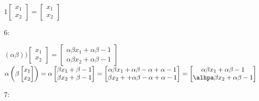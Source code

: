 \begin{solution}
		   \begin{center}
		    $
		    1
		    \begin{bmatrix}
		         x_1 \\ x_2
		    \end{bmatrix}
		    =
		    \begin{bmatrix}
		         x_1 \\ x_2
		    \end{bmatrix}
		    $
		    \end{center}
		   
		   
		   6:\\
		   
		   \begin{center}
		    $
		    \left( \alpha \beta \right))
		    \begin{bmatrix}
		         x_1 \\ x_2
		    \end{bmatrix}
		    =
		    \begin{bmatrix}
		        \alpha \beta x_1 + \alpha \beta -1 \\ \alpha \beta x_2 + \alpha \beta -1
		    \end{bmatrix}
		    $
		    \\
		    $
		    \alpha \left( \beta 
		    \begin{bmatrix}
		    x_1 \\ x_2
		    \end{bmatrix}
		    \right)
		    = \alpha 
		    \begin{bmatrix}
		   \beta x_1 + \beta -1 \\ \beta x_2 + \beta -1
		    \end{bmatrix}
		    =
		    \begin{bmatrix}
		    \alpha \beta x_1 + \alpha \beta - \alpha + \alpha -1 \\ \beta x_2 + + \alpha \beta - \alpha + \alpha -1
		    \end{bmatrix}
		    =
		    \begin{bmatrix}
		    \alpha \beta x_1 + \alpha \beta -1 \\ \alhpa \beta x_2 + \alpha \beta -1
		    \end{bmatrix}
		    $
		    \end{center}
		   
		   7:\\
		   

\end{solution}
